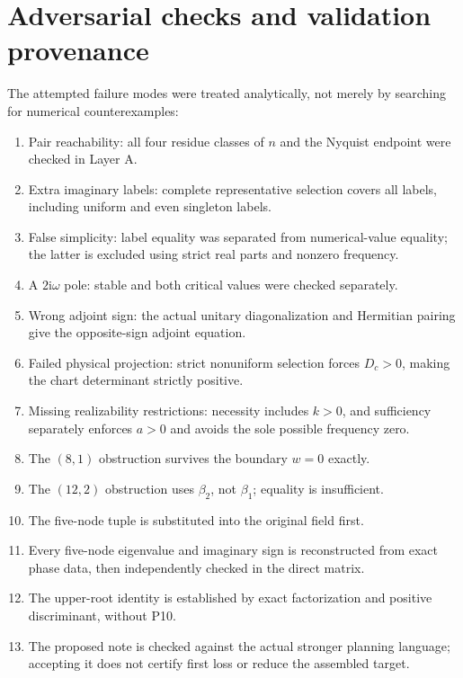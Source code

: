 \documentclass[11pt]{article}
\newcommand{\ii}{\mathrm i}
\begin{document}
\section{Adversarial checks and validation provenance}
\label{sec:checks}
The attempted failure modes were treated analytically, not merely by
searching for numerical counterexamples:
\begin{enumerate}[leftmargin=2em]
\item Pair reachability: all four residue classes of $n$ and the Nyquist
endpoint were checked in Layer A.
\item Extra imaginary labels: complete representative selection covers all
labels, including uniform and even singleton labels.
\item False simplicity: label equality was separated from numerical-value
equality; the latter is excluded using strict real parts and nonzero frequency.
\item A $2\ii\omega$ pole: stable and both critical values were checked separately.
\item Wrong adjoint sign: the actual unitary diagonalization and Hermitian
pairing give the opposite-sign adjoint equation.
\item Failed physical projection: strict nonuniform selection forces
$D_c>0$, making the chart determinant strictly positive.
\item Missing realizability restrictions: necessity includes $k>0$, and
sufficiency separately enforces $a>0$ and avoids the sole possible frequency zero.
\item The $(8,1)$ obstruction survives the boundary $w=0$ exactly.
\item The $(12,2)$ obstruction uses $\beta_2$, not $\beta_1$; equality is insufficient.
\item The five-node tuple is substituted into the original field first.
\item Every five-node eigenvalue and imaginary sign is reconstructed from
exact phase data, then independently checked in the direct matrix.
\item The upper-root identity is established by exact factorization and
positive discriminant, without P10.
\item The proposed note is checked against the actual stronger planning
language; accepting it does not certify first loss or reduce the assembled target.
\end{enumerate}
\end{document}
